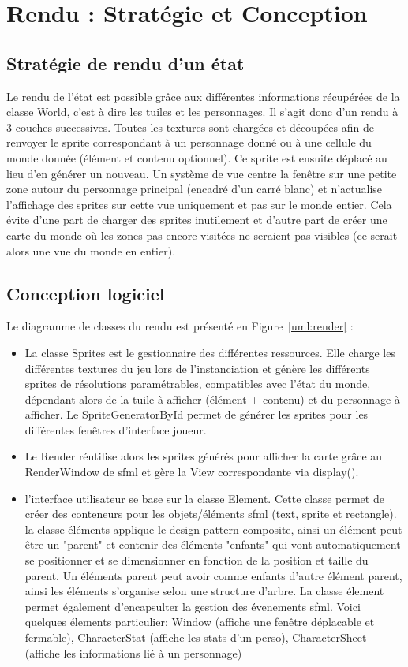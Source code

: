 \documentclass[a4paper,12pt]{article}
\begin{document}
\clearpage
\section{Rendu : Stratégie et Conception}

\subsection{Stratégie de rendu d’un état}
Le rendu de l'état est possible grâce aux différentes informations récupérées de la classe World, c'est à dire les tuiles et les personnages. Il s'agit donc d'un rendu à 3 couches successives. Toutes les textures sont chargées et découpées afin de renvoyer le sprite correspondant à un personnage donné ou à une cellule du monde donnée (élément et contenu optionnel). Ce sprite est ensuite déplacé au lieu d'en générer un nouveau. Un système de vue centre la fenêtre sur une petite zone autour du personnage principal (encadré d'un carré blanc) et n'actualise l'affichage des sprites sur cette vue uniquement et pas sur le monde entier. Cela évite d'une part de charger des sprites inutilement et d'autre part de créer une carte du monde où les zones pas encore visitées ne seraient pas visibles (ce serait alors une vue du monde en entier).


\subsection{Conception logiciel}

Le diagramme de classes du rendu est présenté en Figure~\ref{uml:render} : 
\begin{itemize}
    \item La classe Sprites est le gestionnaire des différentes ressources. Elle charge les différentes textures du jeu lors de l'instanciation et génère les différents sprites de résolutions paramétrables, compatibles avec l'état du monde, dépendant alors de la tuile à afficher (élément + contenu) et du personnage à afficher. Le SpriteGeneratorById permet de générer les sprites pour les différentes fenêtres d'interface joueur.
    \item Le Render réutilise alors les sprites générés pour afficher la carte grâce au RenderWindow de sfml et gère la View correspondante via display().
    \item 
        l'interface utilisateur se base sur la classe Element. 
        Cette classe permet de créer des conteneurs pour les objets/éléments sfml (text, sprite et rectangle).
        la classe éléments applique le design pattern composite, ainsi un élément peut être un "parent" et contenir des éléments "enfants" qui vont automatiquement se positionner et se dimensionner en fonction de la position et taille du parent. 
        Un éléments parent peut avoir comme enfants d'autre élément parent, ainsi les éléments s'organise selon une structure d'arbre.
        La classe élement permet également d'encapsulter la gestion des évenements sfml.
        Voici quelques élements particulier: Window (affiche une fenêtre déplacable et fermable), CharacterStat (affiche les stats d'un perso), CharacterSheet (affiche les informations lié à un personnage)
\end{itemize}
\end{document}
